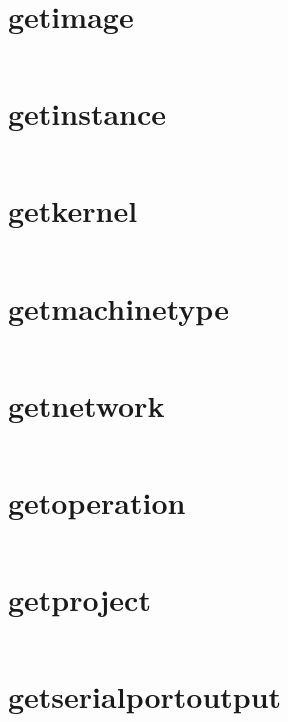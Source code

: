 \section{getimage}
\begin{lstlisting}[language=Bash]
\end{lstlisting}

\section{getinstance}
\begin{lstlisting}[language=Bash]
\end{lstlisting}

\section{getkernel}
\begin{lstlisting}[language=Bash]
\end{lstlisting}

\section{getmachinetype}
\begin{lstlisting}[language=Bash]
\end{lstlisting}

\section{getnetwork}
\begin{lstlisting}[language=Bash]
\end{lstlisting}

\section{getoperation}
\begin{lstlisting}[language=Bash]
\end{lstlisting}

\section{getproject}
\begin{lstlisting}[language=Bash]
\end{lstlisting}

\section{getserialportoutput}
\begin{lstlisting}[language=Bash]
\end{lstlisting}


